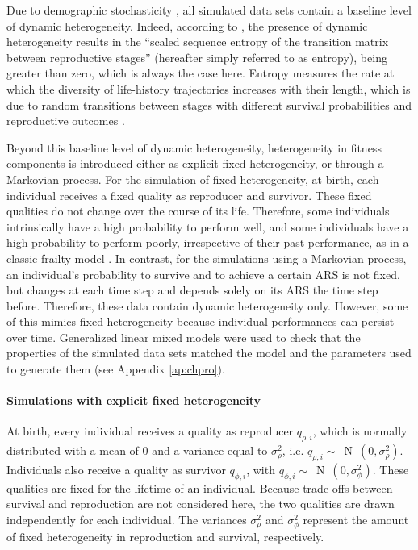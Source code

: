 Due to demographic stochasticity \parencite[sensu][]{Fox2002}, all simulated data sets contain a baseline level of dynamic heterogeneity. Indeed, according to \cite{Tuljapurkar2009}, the presence of dynamic heterogeneity results in the ``scaled sequence entropy of the transition matrix between reproductive stages'' (hereafter simply referred to as entropy), being greater than zero, which is always the case here. Entropy measures the rate at which the diversity of life-history trajectories increases with their length, which is due to random transitions between stages with different survival probabilities and reproductive outcomes \parencite{Tuljapurkar2009}.

Beyond this baseline level of dynamic heterogeneity, heterogeneity in fitness components is introduced either as explicit fixed heterogeneity, or through a Markovian process. For the simulation of fixed heterogeneity, at birth, each individual receives a fixed quality as reproducer and survivor. These fixed qualities do not change over the course of its life. Therefore, some individuals intrinsically have a high probability to perform well, and some individuals have a high probability to perform poorly, irrespective of their past performance, as in a classic frailty model \parencite{Vaupel1979}. In contrast, for the simulations using a Markovian process, an individual's probability to survive and to achieve a certain ARS is not fixed, but changes at each time step and depends solely on its ARS the time step before. Therefore, these data contain dynamic heterogeneity only. However, some of this mimics fixed heterogeneity because individual performances can persist over time. Generalized linear mixed models were used to check that the properties of the simulated data sets matched the model and the parameters used to generate them (see Appendix \ref{ap:chpro}).

\paragraph{Simulations with explicit fixed heterogeneity}
At birth, every individual receives a quality as reproducer $q_{\rho,i}$, which is normally distributed with a mean of 0 and a variance equal to $\sigma_{\rho}^2$, i.e. \mbox{$q_{\rho,i}\sim$ {\selectfont N }$(0,\sigma_{\rho}^2)$.} Individuals also receive a quality as survivor $q_{\phi,i}$, with \mbox{$q_{\phi,i}\sim$ {\selectfont N }$(0,\sigma_{\phi}^2)$.} These qualities are fixed for the lifetime of an individual. Because trade-offs between survival and reproduction are not considered here, the two qualities are drawn independently for each individual. The variances $\sigma_{\rho}^2$ and $\sigma_{\phi}^2$ represent the amount of fixed heterogeneity in reproduction and survival, respectively. 

